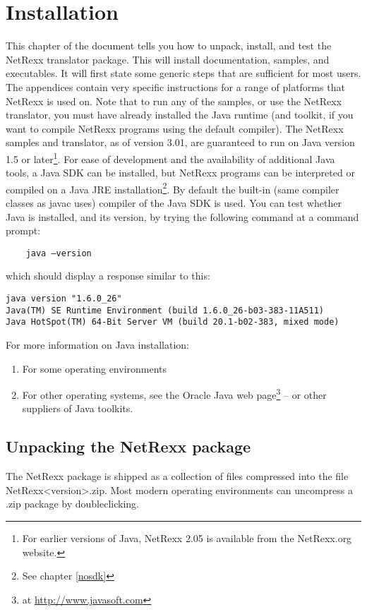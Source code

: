 \chapter{Installation}
This chapter of the document tells you how to unpack, install, and test the NetRexx translator package. This will install documentation, samples, and executables. It will first state some generic steps that are sufficient for most users. The appendices contain very specific instructions for a range of platforms that NetRexx is used on. 
Note that to run any of the samples, or use the NetRexx translator, you must have already installed the Java runtime (and toolkit, if you want to compile NetRexx programs using the default compiler). 
The NetRexx samples and translator, as of version 3.01, are
guaranteed to run on Java version 1.5 or later\footnote{For earlier versions of Java,
  NetRexx 2.05 is available from the NetRexx.org website.}. For ease
of development and the availability of additional Java tools, a Java
SDK can be installed, but NetRexx
programs can be interpreted or compiled on a Java JRE
installation\footnote{See chapter \ref{nosdk}}. By
default the built-in (same compiler classes as javac uses) compiler of the Java SDK is used. You can test whether Java is installed, and its version, by trying the following command at a command prompt:
\begin{verbatim} 
    java –version
\end{verbatim}
which should display a response similar to this:
\begin{verbatim} 
java version "1.6.0_26"
Java(TM) SE Runtime Environment (build 1.6.0_26-b03-383-11A511)
Java HotSpot(TM) 64-Bit Server VM (build 20.1-b02-383, mixed mode)
\end{verbatim}
For more information on Java installation:
\begin{enumerate} 
\item For some operating environments
\item For other operating systems, see the Oracle Java web page\footnote{at \url{http://www.javasoft.com}} – or other suppliers of Java toolkits.
\end{enumerate}
\section{Unpacking the NetRexx package}
The NetRexx package is shipped as a collection of files compressed into the file NetRexx<version>.zip. 
Most modern operating environments can uncompress a .zip package by doubleclicking.
